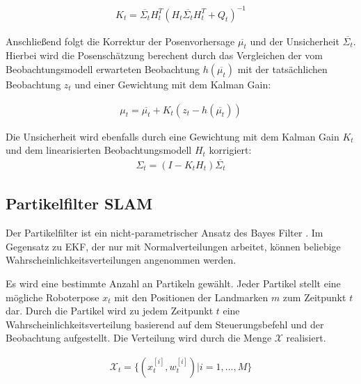 \begin{align}
	K_t = \overline{\Sigma_t} H_t^T(H_t \overline{\Sigma_t} H_t^T + Q_t)^{-1}
\end{align}

Anschließend folgt die Korrektur der Posenvorhersage $ \overline{\mu_t} $ und der Unsicherheit $ \overline{\Sigma_t} $. Hierbei wird die Posenschätzung berechent durch das Vergleichen der vom Beobachtungsmodell erwarteten Beobachtung $ h(\overline{\mu_t}) $ mit der tatsächlichen Beobachtung $ z_t $ und einer Gewichtung mit dem Kalman Gain:


\begin{align}
	\mu_t = \overline{\mu_t} + K_t(z_t - h(\overline{\mu_t}))
\end{align}

Die Unsicherheit wird ebenfalls durch eine Gewichtung mit dem Kalman Gain $ K_t $ und dem linearisierten Beobachtungsmodell $ H_t $ korrigiert:
\begin{align}
	\Sigma_t = (I - K_t H_t) \overline{\Sigma_t}
\end{align}


\subsection[Partikelfilter SLAM (Kopp)]{Partikelfilter SLAM}

Der Partikelfilter ist ein nicht-parametrischer Ansatz des Bayes Filter \cite{thrun2005}. Im Gegensatz zu EKF, der nur mit Normalverteilungen arbeitet, können beliebige Wahrscheinlichkeitsverteilungen angenommen werden.

Es wird eine bestimmte Anzahl an Partikeln gewählt. Jeder Partikel stellt eine mögliche Roboterpose $ x_t $ mit den Positionen der Landmarken $ m $ zum Zeitpunkt $ t $ dar. Durch die Partikel wird zu jedem Zeitpunkt $ t $ eine Wahrscheinlichkeitsverteilung basierend auf dem Steuerungsbefehl und der Beobachtung aufgestellt. Die Verteilung wird durch die Menge $\mathcal{X}$ realisiert. 
 
\begin{align}
	\mathcal{X}_t = \{(x_t^{[i]},w_t^{[i]}) | i = 1,...,M\}
\end{align}

